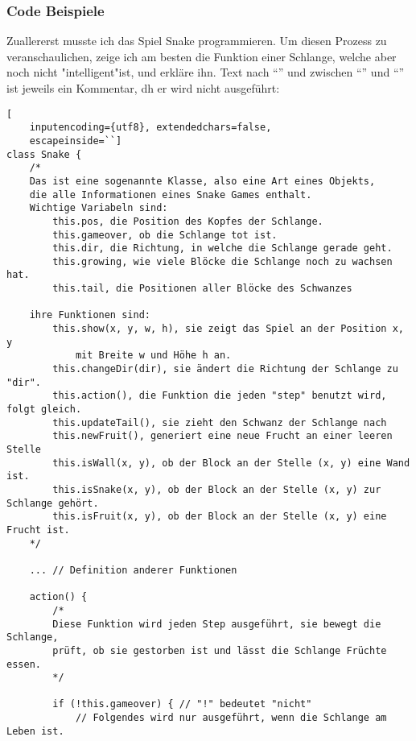 \documentclass[10pt,a4paper,ngerman,english]{article}
\begin{document}
\subsubsection{Code Beispiele}

Zuallererst musste ich das Spiel Snake programmieren. Um diesen Prozess zu veranschaulichen, zeige ich am besten die  Funktion einer Schlange, welche aber noch nicht "intelligent"ist, und erkläre ihn. Text nach \enquote{\textCode{//}} und zwischen \enquote{\textCode{/*}} und \enquote{\textCode{*/}} ist jeweils ein Kommentar, dh er wird nicht ausgeführt:

\begin{lstlisting}[
    inputencoding={utf8}, extendedchars=false,  
    escapeinside=``]
class Snake { 
    /* 
    Das ist eine sogenannte Klasse, also eine Art eines Objekts,
    die alle Informationen eines Snake Games enthalt. 
    Wichtige Variabeln sind:
        this.pos, die Position des Kopfes der Schlange.
        this.gameover, ob die Schlange tot ist.
        this.dir, die Richtung, in welche die Schlange gerade geht.
        this.growing, wie viele Blöcke die Schlange noch zu wachsen hat.
        this.tail, die Positionen aller Blöcke des Schwanzes

    ihre Funktionen sind:
        this.show(x, y, w, h), sie zeigt das Spiel an der Position x, y 
            mit Breite w und Höhe h an.
        this.changeDir(dir), sie ändert die Richtung der Schlange zu "dir".
        this.action(), die Funktion die jeden "step" benutzt wird, folgt gleich.
        this.updateTail(), sie zieht den Schwanz der Schlange nach
        this.newFruit(), generiert eine neue Frucht an einer leeren Stelle
        this.isWall(x, y), ob der Block an der Stelle (x, y) eine Wand ist.
        this.isSnake(x, y), ob der Block an der Stelle (x, y) zur Schlange gehört.
        this.isFruit(x, y), ob der Block an der Stelle (x, y) eine Frucht ist.
    */

    ... // Definition anderer Funktionen

    action() {
        /*
        Diese Funktion wird jeden Step ausgeführt, sie bewegt die Schlange, 
        prüft, ob sie gestorben ist und lässt die Schlange Früchte essen.
        */

        if (!this.gameover) { // "!" bedeutet "nicht"
            // Folgendes wird nur ausgeführt, wenn die Schlange am Leben ist.


\end{lstlisting}
\end{document}
